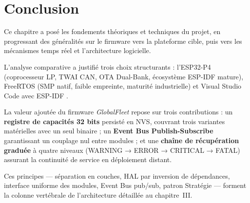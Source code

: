 \section{Conclusion}
\label{sec:conclu_ch2}

Ce chapitre a posé les fondements théoriques et techniques du projet,
en progressant des généralités sur le firmware vers la plateforme
cible, puis vers les mécanismes temps réel et l'architecture logicielle.

L'analyse comparative a justifié trois choix structurants : l'ESP32-P4
(coprocesseur LP, TWAI CAN, OTA Dual-Bank, écosystème ESP-IDF mature),
FreeRTOS (SMP natif, faible empreinte, maturité industrielle) et
Visual Studio Code avec ESP-IDF .

La valeur ajoutée du firmware \textit{GlobalFleet} repose sur trois
contributions : un \textbf{registre de capacités 32 bits} persisté en
NVS, couvrant trois variantes matérielles avec un seul binaire ; un
\textbf{Event Bus Publish-Subscribe} garantissant un couplage nul entre
modules ; et une \textbf{chaîne de récupération graduée} à quatre
niveaux (WARNING → ERROR → CRITICAL → FATAL) assurant la continuité de
service en déploiement distant.

Ces principes — séparation en couches, HAL par inversion de
dépendances, interface uniforme des modules, Event Bus pub/sub, patron
Stratégie — forment la colonne vertébrale de l'architecture détaillée
au chapitre~III.